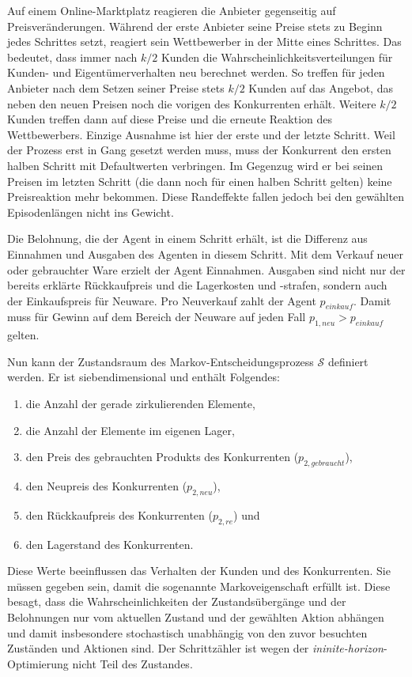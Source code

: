 Auf einem Online-Marktplatz reagieren die Anbieter gegenseitig auf Preisveränderungen.
Während der erste Anbieter seine Preise stets zu Beginn jedes Schrittes setzt, reagiert sein Wettbewerber in der Mitte eines Schrittes.
Das bedeutet, dass immer nach $k/2$ Kunden die Wahrscheinlichkeitsverteilungen für Kunden- und Eigentümerverhalten neu berechnet werden.
So treffen für jeden Anbieter nach dem Setzen seiner Preise stets $k/2$ Kunden auf das Angebot, das neben den neuen Preisen noch die vorigen des Konkurrenten erhält.
Weitere $k/2$ Kunden treffen dann auf diese Preise und die erneute Reaktion des Wettbewerbers.
Einzige Ausnahme ist hier der erste und der letzte Schritt.
Weil der Prozess erst in Gang gesetzt werden muss, muss der Konkurrent den ersten halben Schritt mit Defaultwerten verbringen.
Im Gegenzug wird er bei seinen Preisen im letzten Schritt (die dann noch für einen halben Schritt gelten) keine Preisreaktion mehr bekommen.
Diese Randeffekte fallen jedoch bei den gewählten Episodenlängen nicht ins Gewicht.

Die Belohnung, die der Agent in einem Schritt erhält, ist die Differenz aus Einnahmen und Ausgaben des Agenten in diesem Schritt.
Mit dem Verkauf neuer oder gebrauchter Ware erzielt der Agent Einnahmen.
Ausgaben sind nicht nur der bereits erklärte Rückkaufpreis und die Lagerkosten und -strafen, sondern auch der Einkaufspreis für Neuware.
Pro Neuverkauf zahlt der Agent $p_{einkauf}$.
Damit muss für Gewinn auf dem Bereich der Neuware auf jeden Fall $p_{1, neu} > p_{einkauf}$ gelten.

Nun kann der Zustandsraum des Markov-Entscheidungsprozess $\mathcal{S}$ definiert werden.
Er ist siebendimensional und enthält Folgendes:
\begin{enumerate}
	\item die Anzahl der gerade zirkulierenden Elemente,
	\item die Anzahl der Elemente im eigenen Lager,
	\item den Preis des gebrauchten Produkts des Konkurrenten ($p_{2, gebraucht}$),
	\item den Neupreis des Konkurrenten ($p_{2, neu}$),
	\item den Rückkaufpreis des Konkurrenten ($p_{2, re}$) und
	\item den Lagerstand des Konkurrenten.
\end{enumerate}
Diese Werte beeinflussen das Verhalten der Kunden und des Konkurrenten.
Sie müssen gegeben sein, damit die sogenannte Markoveigenschaft erfüllt ist.
Diese besagt, dass die Wahrscheinlichkeiten der Zustandsübergänge und der Belohnungen nur vom aktuellen Zustand und der gewählten Aktion abhängen und damit insbesondere stochastisch unabhängig von den zuvor besuchten Zuständen und Aktionen sind.
Der Schrittzähler ist wegen der \textit{ininite-horizon}-Optimierung nicht Teil des Zustandes.

